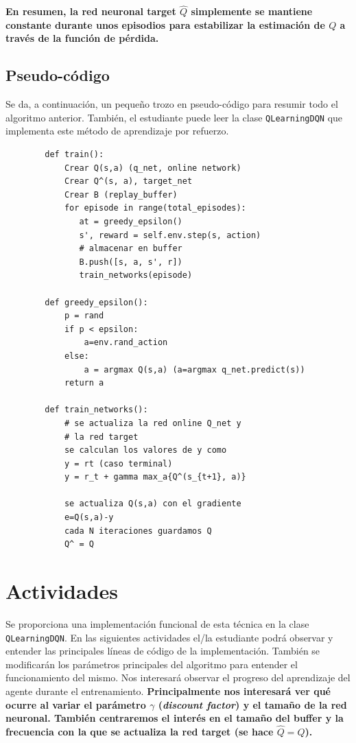 \documentclass{article}
\begin{document}
\textbf{En resumen, la red neuronal target $\hat{Q}$ simplemente se mantiene constante durante unos episodios para estabilizar la estimación de $Q$ a través de la función de pérdida.}

\subsection{Pseudo-código}
Se da, a continuación, un pequeño trozo en pseudo-código para resumir todo el algoritmo anterior. También, el estudiante puede leer la clase \texttt{QLearningDQN} que implementa este método de aprendizaje por refuerzo.

\begin{small}
    \begin{verbatim}
        def train():
            Crear Q(s,a) (q_net, online network)
            Crear Q^(s, a), target_net
            Crear B (replay_buffer)
            for episode in range(total_episodes):
               at = greedy_epsilon()
               s', reward = self.env.step(s, action)
               # almacenar en buffer
               B.push([s, a, s', r])
               train_networks(episode)
               
        def greedy_epsilon():
            p = rand
            if p < epsilon:
                a=env.rand_action
            else:
                a = argmax Q(s,a) (a=argmax q_net.predict(s))
            return a
            
        def train_networks():
            # se actualiza la red online Q_net y
            # la red target
            se calculan los valores de y como
            y = rt (caso terminal)
            y = r_t + gamma max_a{Q^(s_{t+1}, a)}

            se actualiza Q(s,a) con el gradiente
            e=Q(s,a)-y
            cada N iteraciones guardamos Q
            Q^ = Q
    \end{verbatim}    
\end{small}

\section{Actividades}
Se proporciona una implementación funcional de esta técnica en la clase \texttt{QLearningDQN}. En las siguientes actividades el/la estudiante podrá observar y entender las principales líneas de código de la implementación. También se modificarán los parámetros principales del algoritmo para entender el funcionamiento del mismo. Nos interesará observar el progreso del aprendizaje del agente durante el entrenamiento. \textbf{Principalmente nos interesará ver qué ocurre al variar el parámetro $\gamma$ (\textit{discount factor}) y el tamaño de la red neuronal. También centraremos el interés en el tamaño del buffer y la frecuencia con la que se actualiza la red target (se hace $\hat{Q}=Q$).}
\end{document}
